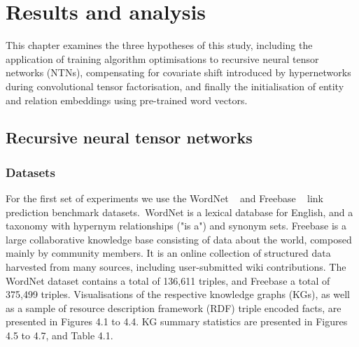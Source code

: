 

\chapter{Results and analysis}  %

\ifpdf
     \graphicspath{{Figs/Chapter4/}}
\else
    \graphicspath{{Chapter4/Figs/Vector/}{Chapter4/Figs/}}
\fi

This chapter examines the three hypotheses of this study, including the application of training algorithm optimisations to recursive neural tensor networks (NTNs), compensating for covariate shift introduced by hypernetworks during convolutional tensor factorisation, and finally the initialisation of entity and relation embeddings using pre-trained word vectors. 



\section{Recursive neural tensor networks}

\subsection{Datasets} 

For the first set of experiments we use the WordNet \unskip ~\citep{miller1995wordnet} and Freebase \unskip ~\citep{bollacker2008freebase} link prediction benchmark datasets.\ WordNet is a lexical database for English, and a taxonomy with hypernym relationships ("is a") and synonym sets. Freebase is a large collaborative knowledge base consisting of data about the world, composed mainly by community members. It is an online collection of structured data harvested from many sources, including user-submitted wiki contributions. The WordNet dataset contains a total of 136,611 triples, and Freebase a total of 375,499 triples. Visualisations of the respective knowledge graphs (KGs), as well as a sample of resource description framework (RDF) triple encoded facts, are presented in Figures 4.1 to 4.4. KG summary statistics are presented in Figures 4.5 to 4.7, and Table 4.1.

